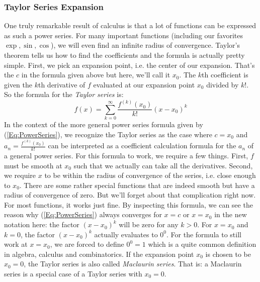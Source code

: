 \subsubsection{Taylor Series Expansion}
\label{Sec:TaylorSeries}
One truly remarkable result of calculus is that a lot of functions can be expressed as such a power series. For many important functions (including our favorites $\exp, \sin, \cos$), we will even find an infinite radius of convergence. Taylor's theorem tells us how to find the coefficients and the formula is actually pretty simple. First, we pick an expansion point, i.e. the center of our expansion. That's the $c$ in the formula given above but here, we'll call it $x_0$. The $k$th coefficient is given the $k$th derivative of $f$ evaluated at our expansion point $x_0$ divided by $k!$. So the formula for the \emph{Taylor series} is:
\begin{equation}
\label{Eq:TaylorSeries}
f(x) = \sum_{k=0}^\infty \frac{f^{(k)}(x_0)}{k!} (x-x_0)^k
\end{equation}
In the context of the more general power series formula given by (\ref{Eq:PowerSeries}), we recognize the Taylor series as the case where $c = x_0$ and $a_n =  \frac{f^{(k)}(x_0)}{k!}$ can be interpreted as a coefficient calculation formula for the $a_n$ of a general power series. For this formula to work, we require a few things. First, $f$ must be smooth at $x_0$ such that we actually can take all the derivatives. Second, we require $x$ to be within the radius of convergence of the series, i.e. close enough to $x_0$. There are some rather special functions that are indeed smooth but have a radius of convergence of zero. But we'll forget about that complication right now. For most functions, it works just fine. By inspecting this formula, we can see the reason why (\ref{Eq:PowerSeries}) always converges for $x=c$ or $x=x_0$ in the new notation here: the factor $(x-x_0)^k$ will be zero for any $k > 0$. For $x = x_0$ and $k = 0$, the factor $(x-x_0)^k$ actually evaluates to $0^0$. For the formula to still work at $x=x_0$, we are forced to define $0^0 = 1$ which is a quite common definition in algebra, calculus and combinatorics. If the expansion point $x_0$ is chosen to be $x_0 = 0$, the Taylor series is also called \emph{Maclaurin series}. That is: a Maclaurin series is a special case of a Taylor series with $x_0 = 0$. 


